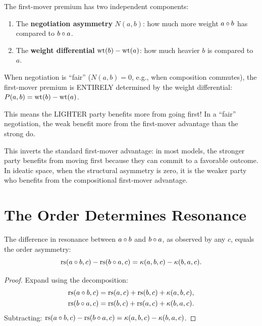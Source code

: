 \begin{paradox}
The first-mover premium has two independent components:
\begin{enumerate}
\item The \textbf{negotiation asymmetry} $N(a,b)$: how much more weight $a \circ b$ has compared to $b \circ a$.
\item The \textbf{weight differential} $\operatorname{wt}(b) - \operatorname{wt}(a)$: how much heavier $b$ is compared to $a$.
\end{enumerate}

When negotiation is ``fair'' ($N(a,b) = 0$, e.g., when composition commutes), the first-mover premium is ENTIRELY determined by the weight differential: $P(a,b) = \operatorname{wt}(b) - \operatorname{wt}(a)$.

This means the LIGHTER party benefits more from going first! In a ``fair'' negotiation, the weak benefit more from the first-mover advantage than the strong do.

This inverts the standard first-mover advantage: in most models, the stronger party benefits from moving first because they can commit to a favorable outcome. In ideatic space, when the structural asymmetry is zero, it is the weaker party who benefits from the compositional first-mover advantage.
\end{paradox}

\section{The Order Determines Resonance}

\begin{theorem}
The difference in resonance between $a \circ b$ and $b \circ a$, as observed by any $c$, equals the order asymmetry:
\[
\operatorname{rs}(a \circ b, c) - \operatorname{rs}(b \circ a, c) = \kappa(a,b,c) - \kappa(b,a,c).
\]
\end{theorem}

\begin{proof}
Expand using the decomposition:
\begin{align*}
\operatorname{rs}(a \circ b, c) &= \operatorname{rs}(a,c) + \operatorname{rs}(b,c) + \kappa(a,b,c), \\
\operatorname{rs}(b \circ a, c) &= \operatorname{rs}(b,c) + \operatorname{rs}(a,c) + \kappa(b,a,c).
\end{align*}
Subtracting: $\operatorname{rs}(a \circ b, c) - \operatorname{rs}(b \circ a, c) = \kappa(a,b,c) - \kappa(b,a,c)$.
\end{proof}

